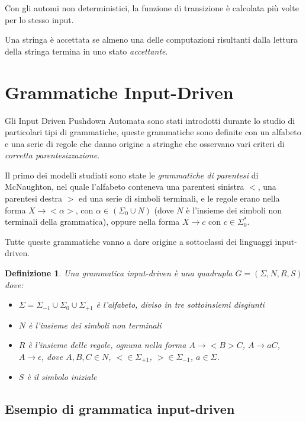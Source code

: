 \documentclass[a4paper,12pt]{report}
\newtheorem{definition}{Definizione}[chapter]
\theoremstyle{propositionstyle}
\begin{document}
    Con gli automi non deterministici, la funzione di transizione è calcolata più volte per lo stesso input. 
    
    Una stringa è accettata se almeno una delle computazioni risultanti dalla lettura della stringa termina in uno stato \textit{accettante}.

    \section{Grammatiche Input-Driven}

    Gli Input Driven Pushdown Automata sono stati introdotti durante lo studio di particolari tipi di grammatiche, queste grammatiche sono definite
    con un alfabeto e una serie di regole che danno origine a stringhe che osservano vari criteri di \textit{corretta parentesizzazione}.
    
    Il primo dei modelli studiati sono state le \textit{grammatiche di parentesi} di McNaughton, nel quale l'alfabeto conteneva una parentesi sinistra $<$, una parentesi destra $>$
    ed una serie di simboli terminali, e le regole erano nella forma $X \rightarrow <\alpha>$, con $\alpha \in (\Sigma_0 \cup N)$ (dove $N$ è l'insieme dei simboli non terminali della grammatica), oppure nella forma $X \rightarrow c$ con $c \in \Sigma_0^*$.
    
    Tutte queste grammatiche vanno a dare origine a sottoclassi dei linguaggi input-driven.

    \begin{definition}
        Una grammatica input-driven è una quadrupla $G = (\Sigma, N, R, S)$ dove:
        \begin{itemize}
            \item $\Sigma = \Sigma_{-1} \cup \Sigma_0 \cup \Sigma_{+1}$ è l'alfabeto, diviso in tre sottoinsiemi disgiunti
            \item $N$ è l'insieme dei simboli non terminali
            \item $R$ è l'insieme delle regole, ognuna nella forma $A \rightarrow <B>C$, $A \rightarrow aC$, $A \rightarrow \epsilon$, dove $A, B, C \in N$, $< \in \Sigma_{+1}$, $> \in \Sigma_{-1}$, $a \in \Sigma$.
            \item $S$ è il simbolo iniziale
        \end{itemize}
    \end{definition}

    \subsection{Esempio di grammatica input-driven}
    
\end{document}
